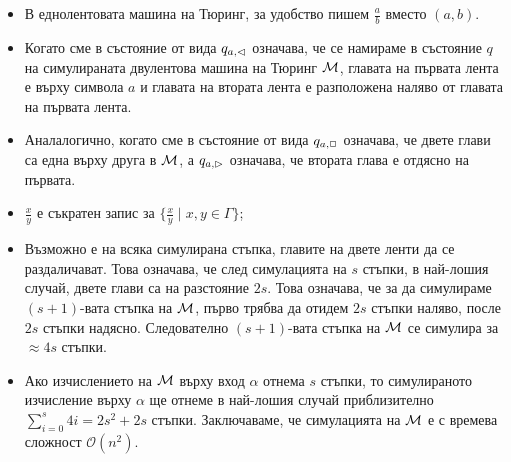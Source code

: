 \begin{itemize}
\item
  В еднолентовата машина на Тюринг, за удобство пишем $\frac{a}{b}$ вместо $(a,b)$.
\item
  Когато сме в състояние от вида $q_{a,\lhd}$ означава, че се намираме 
  в състояние $q$ на симулираната двулентова машина на Тюринг $\mathcal{M}$,
  главата на първата лента е върху символа $a$ и главата на втората лента е разположена наляво от главата на първата лента.
\item
  Аналалогично, когато сме в състояние от вида $q_{a,\Box}$ означава, че двете глави са една върху друга в $\mathcal{M}$, 
  а $q_{a,\rhd}$ означава, че втората глава е отдясно на първата.
\item 
  $\frac{x}{y}$ е съкратен запис за $\{\frac{x}{y} \mid x,y \in \Gamma\}$;
\item
  Възможно е на всяка симулирана стъпка, главите на двете ленти да се раздаличават.
  Това означава, че след симулацията на $s$ стъпки, в най-лошия случай, 
  двете глави са на разстояние $2s$. Това означава, че за да симулираме $(s+1)$-вата стъпка на $\mathcal{M}$,
  първо трябва да отидем $2s$ стъпки наляво, после $2s$ стъпки надясно.
  Следователно $(s+1)$-вата стъпка на $\mathcal{M}$ се симулира за $\approx 4s$ стъпки.
\item
  Ако изчислението на $\mathcal{M}$ върху вход $\alpha$ отнема $s$ стъпки,
  то симулираното изчисление върху $\alpha$ ще отнеме в най-лошия случай приблизително $\sum^s_{i=0}4i = 2s^2+2s$ стъпки.
  Заключаваме, че симулацията на $\mathcal{M}$ е с времева сложност $\mathcal{O}(n^2)$.
\end{itemize}



